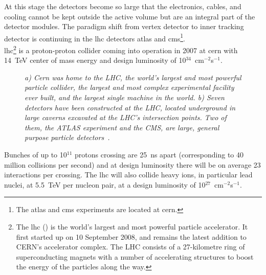 At this stage the detectors become so large that the electronics, cables, and
cooling cannot be kept outside the active volume but are an integral part of the
detector modules. The paradigm shift from vertex detector to inner tracking
detector is continuing in the \gls{lhc} detectors \gls{atlas} and
\gls{cms}\footnote{The \gls{atlas}
  and \gls{cms} experiments are located at \gls{cern}.}.\\
\gls{lhc}\footnote{The \gls{lhc} () is the world's largest and
  most powerful particle accelerator. It first started up on 10 September 2008,
  and remains the latest addition to CERN's accelerator complex. The LHC
  consists of a 27-kilometre ring of superconducting magnets with a number of
  accelerating structures to boost the energy of the particles along the way.}
is a proton-proton collider coming into operation in 2007 at \gls{cern} with
14~TeV center of mass energy and design luminosity of
10$^{34}$~cm$^{-2}$s$^{-1}$.
\begin{figure}[!htbp]
  \centering {}
  \caption{\textit{a) Cern was home to the LHC, the world's largest and most
      powerful particle collider, the largest and most complex experimental
      facility ever built, and the largest single machine in the world. b) Seven
      detectors have been constructed at the LHC, located underground in large
      caverns excavated at the LHC's intersection points. Two of them, the ATLAS
      experiment and the CMS, are large, general purpose particle
      detectors~\cite{Cernlab_a}.}}
  \label{lhc_figure}
\end{figure}
Bunches of up to 10$^{11}$ protons crossing are 25~ns apart (corresponding to 40
million collisions per second) and at design luminosity there will be on average
23 interactions per crossing.  The \gls{lhc} will also collide heavy ions, in
particular lead nuclei, at 5.5~TeV per nucleon pair, at a design luminosity of
10$^{27}$~cm$^{-2}$s$^{-1}$.

